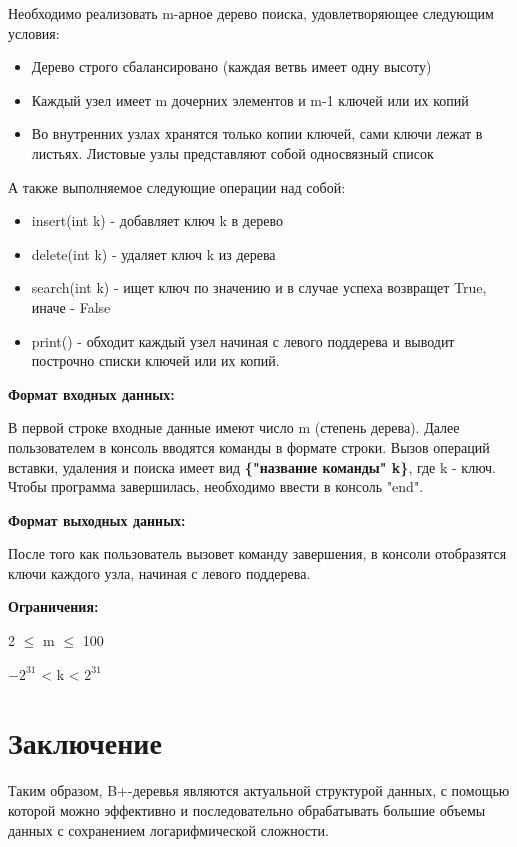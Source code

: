 \documentclass{article}
\begin{document}
Необходимо реализовать m-арное дерево поиска, удовлетворяющее следующим условия:
\begin{itemize}
\item Дерево строго сбалансировано (каждая ветвь имеет одну высоту)
\item Каждый узел имеет m дочерних элементов и m-1 ключей или их копий
\item Во внутренних узлах хранятся только копии ключей, сами ключи лежат в листьях. Листовые узлы представляют собой односвязный список
\end{itemize}

А также выполняемое следующие операции над собой:
\begin{itemize}
    \item insert(int k) - добавляет ключ k в дерево
    \item delete(int k) - удаляет ключ k из дерева
    \item search(int k) - ищет ключ по значению и в случае успеха возвращет True, иначе - False
    \item print() - обходит каждый узел начиная с левого поддерева и выводит построчно списки ключей или их копий.
\end{itemize}

\textbf{Формат входных данных:}

В первой строке входные данные имеют число m (степень дерева). Далее пользователем в консоль вводятся команды в формате строки. Вызов операций вставки, удаления и поиска имеет вид \textbf{\{"название команды" \quad k\}}, где k - ключ. Чтобы программа завершилась, необходимо ввести в консоль "end".

\textbf{Формат выходных данных:}

После того как пользователь вызовет команду завершения, в консоли отобразятся ключи каждого узла, начиная с левого поддерева.

\textbf{Ограничения:}

2 $\leq$ m $\leq$ 100

$-2^{31}$ < k < $2^{31}$
\section{Заключение}

Таким образом, B+-деревья являются актуальной структурой данных, с помощью которой можно эффективно и последовательно обрабатывать большие объемы данных с сохранением логарифмической сложности.
\end{document}

